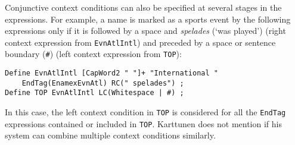 \documentclass{llncs}
\begin{document}
Conjunctive context conditions can also be specified at several stages in the
expressions. For example, a name is marked as a sports event by the
following expressions only if it is followed by a space and
\textit{spelades} (`was played') (right context expression from
\texttt{EvnAtlIntl}) and preceded by a space or sentence boundary
(\texttt{\#}) (left context expression from \texttt{TOP}):

\begin{verbatim}
Define EvnAtlIntl [CapWord2 " "]+ "International "
    EndTag(EnamexEvnAtl) RC(" spelades") ;
Define TOP EvnAtlIntl LC(Whitespace | #) ;
\end{verbatim}

\noindent
In this case, the left context condition in \texttt{TOP} is considered
for all the \texttt{EndTag} expressions contained or included in
\texttt{TOP}. Karttunen \cite{karttunen/2011} does not mention if his
system can combine multiple context conditions similarly.



\end{document}
